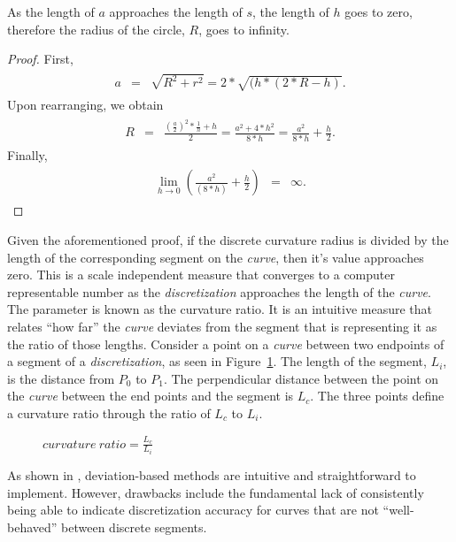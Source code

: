\begin{theorem}
As the length of $a$ approaches the length of $s$, the length of $h$ goes 
to zero, therefore the radius of the circle, $R$, goes to infinity.  
\end{theorem}

\begin{proof}
First, 
\begin{eqnarray}
\begin{array}{lcl}
a & = & \sqrt{R^2+r^2}=2*\sqrt{(h*(2*R-h)}.
\end{array}
\end{eqnarray}
Upon rearranging, we obtain
\begin{eqnarray}
\begin{array}{lcl}
R & = & \frac{(\frac{a}{2})^2*\frac{1}{h}+h}{2}=
\frac{a^2+4*h^2}{8*h}=\frac{a^2}{8*h}+\frac{h}{2}.
\end{array}
\end{eqnarray}
Finally,
\begin{eqnarray}
\begin{array}{lcl}
\lim_{h\to0} (\frac{a^2}{(8*h)}+\frac{h}{2}) & = & \infty.
\end{array}
\end{eqnarray}
\end{proof}

Given the aforementioned proof, if the discrete curvature radius is 
divided by the length of the corresponding segment on the \textit{curve}, then it’s value approaches zero. This is a scale independent measure that converges to a computer representable number as the \textit{discretization} approaches the length of the \textit{curve}. The parameter is known as the curvature ratio. It is an intuitive measure that relates ``how far'' the \textit{curve} deviates from the segment that is representing it as the ratio of those lengths. Consider a point on a \textit{curve} between two endpoints of a segment of a \textit{discretization}, as seen in Figure~\ref{CurvatureRatio}. The length of the segment, $L_i$, is the distance from $P_0$ to $P_1$. The perpendicular distance between the point on the \textit{curve} between the end points and the segment is $L_c$. The three points define a curvature ratio through the ratio of $L_c$ to $L_i$.

\begin{figure}[h!]
  \caption{\label{CurvatureRatio} $curvature \ ratio=  \frac{L_c}{L_i}$ 
\cite{mclaurin10}}
\end{figure}

\noindent As shown in \cite{mclaurin12}, deviation-based methods are 
intuitive and straightforward to implement. However, drawbacks include the fundamental lack of consistently being able to indicate discretization accuracy for curves that are not ``well-behaved'' between discrete segments.
